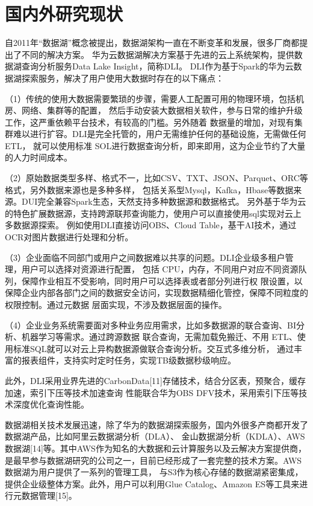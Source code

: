 \section{国内外研究现状}

自2011年“数据湖”概念被提出，数据湖架构一直在不断变革和发展，很多厂商都提出了不同的解决方案。
华为云数据湖解决方案基于先进的云上系统架构，提供数据湖查询分析服务Data Lake Insight，简称DLI。
DLI作为基于Spark的华为云数据湖探索服务，解决了用户使用大数据时存在的以下痛点：

（1）传统的使用大数据需要繁琐的步骤，需要人工配置可用的物理环境，包括机房、网络、集群等的配置，
然后手动安装大数据相关软件，参与日常的维护升级工作，这严重依赖平台技术，有较高的门槛。另外随着
数据量的增加，对现有集群难以进行扩容。DLI是完全托管的，用户无需维护任何的基础设施，无需做任何ETL，
就可以使用标准 SOL进行数据查询分析，即来即用，这为企业节约了大量的人力时间成本。

（2）原始数据类型多样、格式不一，比如CSV、TXT、JSON、Parquet、ORC等格式，另外数据来源也是多种多样，
包括关系型Mysql，Kafka，Hbase等数据来源。DUI完全兼容Spark生态，天然支持多种数据源和数据格式。
另外基于华为云的特色扩展数据源，支持跨源联邦查询能力，使用户可以直接使用sql实现对云上多数据源探索。
例如使用DLI直接访问OBS、Cloud Table，基干AI技术，通过OCR对图片数据进行处理和分析。

（3）企业面临不同部门或用户之间数据难以共享的问题。DLI企业级多租户管理，用户可以选择对资源进行配置，
包括 CPU，内存，不同用户对应不同资源队列，保障作业相互不受影响，同时用户可以选择表或者部分列进行权
限设置，以保障企业内部各部门之间的数据安全访问，实现数据精细化管控，保障不同粒度的权限控制。通过元数据
层面实现，不涉及数据层面的操作。

（4）企业业务系统需要面对多种业务应用需求，比如多数据源的联合查询、BI分析、机器学习等需求。通过跨源数据
联合查询，无需加载免搬迁、不用 ETL、使用标准SQL就可以对云上异构数据源做联合查询分析。交互式多维分析，
通过丰富的报表组件，支持实时定时任务，实现TB级数据秒级响应。

此外，DLI采用业界先进的CarbonData[11]存储技术，结合分区表，预聚合，缓存加速，索引下压等技术加速查询
性能联合华为OBS DFV技术，采用索引下压等技术深度优化查询性能。

数据湖相关技术发展迅速，除了华为的数据湖探索服务，国内外很多产商都开发了数据湖产品，比如阿里云数据湖分析（DLA）、
金山数据湖分析（KDLA）、AWS数据湖[14]等。其中AWS作为知名的大数据和云计算服务以及云解决方案提供商，
是最早参与数据湖研究的公司之一，目前已经形成了一套完整的技术方案。AWS数据湖为用户提供了一系列的管理工具，
与S3作为核心存储的数据湖紧密集成，提供企业级整体方案。此外，用户可以利用Glue Catalog、Amazon ES等工具来进行元数据管理[15]。

